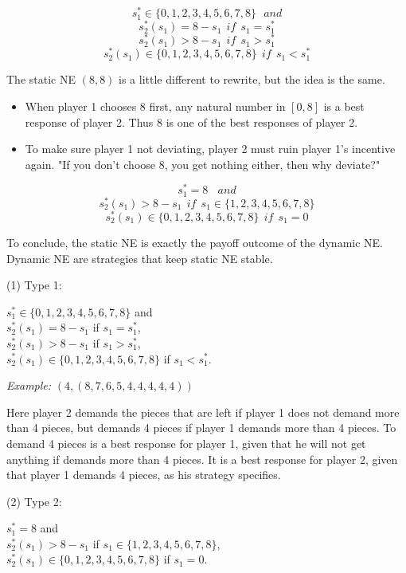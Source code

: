 \documentclass{article}
\begin{document}
\begin{mdframed}[backgroundcolor=blue!20,linecolor=white]
$$s^\ast_1 \in \{0,1,2,3,4,5,6,7,8\} \ \ \  and$$ 
$$s^\ast_2(s_1) = 8 - s_1 \ \ if \ \ s_1 = s^\ast_1$$
$$s^\ast_2(s_1) > 8 - s_1 \ \  if \ \ s_1 > s^\ast_1$$
$$s^\ast_2(s_1) \in \{0,1,2,3,4,5,6,7,8\}\ \  if \ \ s_1 < s^\ast_1$$

The static NE $(8,8)$ is a little different to rewrite, but the idea is the same.
\begin{itemize}
\item When player 1 chooses 8 first, any natural number in $[0,8]$ is a best response of player 2. Thus 8 is one of the best responses of player 2.
\item To make sure player 1 not deviating, player 2 must ruin player 1's incentive again. "If you don't choose 8, you get nothing either, then why deviate?"
\end{itemize}

$$s^\ast_1 = 8 \ \ \ \ and$$ 
$$s^\ast_2(s_1) > 8 - s_1 \ \ if  \ \ s_1 \in \{1,2,3,4,5,6,7,8\}$$
$$s^\ast_2(s_1) \in \{0,1,2,3,4,5,6,7,8\} \ \ if  \ \ s_1 = 0$$

To conclude, the static NE is exactly the payoff outcome of the dynamic NE. 
Dynamic NE are strategies that keep static NE stable.
\end{mdframed}


(1) Type 1:

$s^\ast_1 \in \{0,1,2,3,4,5,6,7,8\}$ and \\
$s^\ast_2(s_1) = 8 - s_1$ if $s_1 = s^\ast_1$, \\
$s^\ast_2(s_1) > 8 - s_1$ if $s_1 > s^\ast_1$, \\
$s^\ast_2(s_1) \in \{0,1,2,3,4,5,6,7,8\}$ if $s_1 < s^\ast_1$. \\

\begin{mdframed}[backgroundcolor=blue!20,linecolor=white]
\textit{Example:} $(4, (8,7,6,5,4,4,4,4,4))$

Here player 2 demands the pieces that are left if player 1 does not demand more than 4 pieces, but demands 4 pieces if player 1 demands more than 4 pieces. 
To demand 4 pieces is a best response for player 1, given that he will not get anything if demands more than 4 pieces.
It is a best response for player 2, given that player 1 demands 4 pieces, as his strategy specifies.
\end{mdframed}


(2) Type 2:

$s^\ast_1 = 8$ and \\
$s^\ast_2(s_1) > 8 - s_1$ if $s_1 \in \{1,2,3,4,5,6,7,8\}$, \\
$s^\ast_2(s_1) \in \{0,1,2,3,4,5,6,7,8\}$ if $s_1 = 0$.
\end{document}
